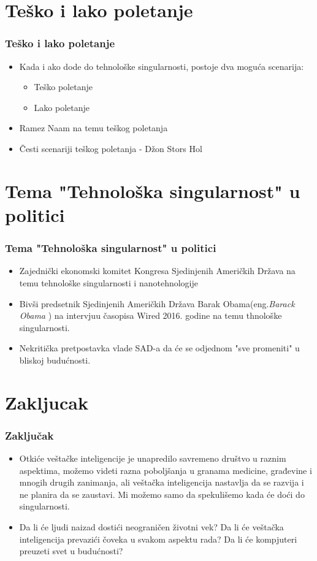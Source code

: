 \documentclass{beamer}
\begin{document}
\section{Teško i lako poletanje}

\begin{frame}[fragile]\frametitle{Teško i lako poletanje}
	\begin{itemize}	
		\item Kada i ako dode do tehnološke singularnosti, postoje dva moguća scenarija:
  \begin{itemize}
  \item Teško poletanje 
  \item  Lako poletanje
  \end{itemize}
		\item Ramez Naam na temu teškog poletanja
		\item Česti scenariji teškog poletanja - Džon Stors Hol
	\end{itemize}
\end{frame}

\section{Tema "Tehnološka singularnost" u politici}

\begin{frame}[fragile]\frametitle{Tema "Tehnološka singularnost" u politici}
	\begin{itemize}	
		\item Zajednički ekonomski komitet Kongresa Sjedinjenih Američkih Država na temu tehnološke singularnosti  i nanotehnologije
		\item Bivši predsetnik Sjedinjenih Američkih Država Barak Obama(eng.\textit{Barack Obama} ) na intervjuu časopisa Wired 2016. godine na temu thnološke singularnosti.
		\item Nekritička pretpostavka vlade SAD-a da će se odjednom "sve promeniti" u bliskoj budućnosti.
	\end{itemize}
\end{frame}

\section{Zakljucak}

\begin{frame}[fragile]\frametitle{Zaključak}
\begin{itemize}	
 \item Otkiće veštačke inteligencije je unapredilo savremeno društvo  u raznim aspektima, možemo videti razna poboljšanja u granama medicine, građevine i mnogih drugih zanimanja, ali veštačka inteligencija nastavlja da se razvija i ne planira da se zaustavi. Mi možemo samo da spekulišemo kada će doći do singularnosti.
\item Da li će ljudi naizad dostići neograničen životni vek? Da li će veštačka inteligencija prevazići čoveka u svakom aspektu rada? Da li će kompjuteri preuzeti svet u budućnosti?

\end{itemize}
\end{frame}
\end{document}
